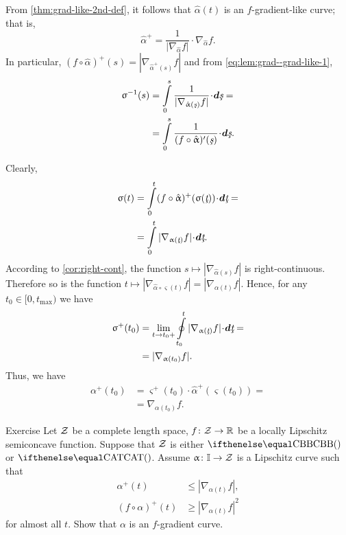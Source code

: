 From \ref{thm:grad-like-2nd-def}, it follows that $\hat\alpha(t)$ is an $f$-gradient-like curve; 
that is,
\[\hat\alpha^+=\frac{1}{|\nabla_{\hat\alpha} f|}\cdot\nabla_{\hat\alpha} f.\]
In particular, $(f\circ\hat\alpha)^+(s)=|\nabla_{\hat\alpha^+(s)} f|$ and from \ref{eq:lem:grad--grad-like-1},
\begin{align*}\varsigma^{-1}(s)
&=\int\limits_0^s\frac{1}{|\nabla_{\hat\alpha(\under s)} f|}\cdot\dd\under s
=
\\
&=
\int\limits_0^s\frac{1}{(f\circ\hat\alpha)'(\under s)}\cdot\dd\under s.
\end{align*}
\medskip

Clearly,
\begin{align*}\varsigma(t)
&=
\int\limits_0^{t}(f\circ\hat\alpha)^+(\varsigma(\under t))\cdot\dd \under t
=
\\
&=
\int\limits_0^{t}|\nabla_{\alpha(\under t)}f|\cdot\dd \under t.
\end{align*}
According to \ref{cor:right-cont}, the function $s\mapsto|\nabla_{\hat\alpha(s)}f|$ is right-continuous.
Therefore so is the function $t\mapsto|\nabla_{\hat\alpha\circ\varsigma(t)}f|=|\nabla_{\alpha(t)}f|$.
Hence, for any $t_0\in[0,t_{\max})$ we have
\begin{align*}\varsigma^+(t_0)
&=
\lim_{t\to t_0+}
\oint\limits_{t_0}^t
|\nabla_{\alpha(\under t)}f|\cdot\dd\under t
=
\\
&=
|\nabla_{\alpha(t_0)}f|.
\end{align*}
Thus, we have 
\begin{align*}\alpha^+(t_0)
&=
\varsigma^+(t_0)\cdot\hat\alpha^+(\varsigma(t_0))
=
\\
&=
\nabla_{\alpha(t_0)} f.
\end{align*}
\qedsf


\begin{thm}{Exercise}\label{ex:grad-curve-condition}
Let $\mathcal{Z}$ be a complete length space, 
$f\:\spc{Z}\to \RR$ be a locally Lipschitz 
semiconcave function.
Suppose that $\mathcal{Z}$ is either $\Alex{}$ or $\CAT{}$.
Assume $\alpha\:\II\to \spc{Z}$ is a Lipschitz curve such that 
\begin{align*}
\alpha^+(t)&\le|\nabla_{\alpha(t)}f|,
\\
(f\circ\alpha)^+(t)&\ge |\nabla_{\alpha(t)}f|^2
\end{align*}
for almost all $t$.
Show that $\alpha$ is an $f$-gradient curve.
\end{thm}



